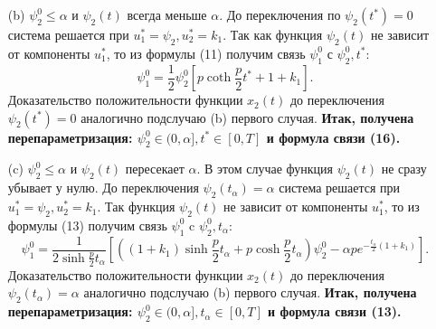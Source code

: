 \documentclass[11pt]{article}
\begin{document}
{\begin{itemize}
{ 		\begin{equation}
 		\psi_2^0 = \alpha e^{-\frac{t_\alpha}{2}(1 + k_1)} \frac{\sinh\frac{p}{2}t^*}{\sinh \frac{p}{2}(t^* - t_\alpha)}.
 		\end{equation}
 		Осталось проверить, что функция $x_2(t)$ положительна при $0 < \psi_2(t) < \alpha.$ Поведение $x_2(t)$ при $t \in [t_\alpha, t^*]$ описывается формулой второй компоненты функции:
 		\[ x(t) = e^{A_x^{k_1}(t - t_\alpha)}x(t_\alpha) + \int_{t\alpha}^{t}\exp\{A_x^{k_1}(t - \tau) \}\begin{pmatrix}
 		0\\
 		\psi_2(\tau)
 		\end{pmatrix}d\tau, \]
 		где $x(t_\alpha)$ определяется формулой (12), а $\psi_2(\tau)$ формулой (9). Из-за громоздкости  выражений не будем приводить доказательство положительности $x_2(t)$. Оно проводится аналогично предыдущему.
 		\newline
 		\textbf{Итак, получена перепараметризация $0 < t_\alpha < t^* \leq T $ и формулы связи (13), (15).}
  	}
 		\item [(b)]{$\psi_2^0 \leq \alpha$ и $\psi_2(t)$ всегда меньше $\alpha.$
 		\newline	
 		До переключения по $\psi_2(t^*) = 0$ система решается при $u_1^* = \psi_2,u_2^* = k_1.$ Так как функция $\psi_2(t)$ не зависит от компоненты $u_1^*$, то из формулы (11) получим связь $\psi_1^0$ с $\psi_2^0,t^*$:
 		\begin{equation}
 		\psi_1^0 = \frac{1}{2}\psi_2^0[p\coth\frac{p}{2}t^* + 1 + k_1].
 		\end{equation}
 		Доказательство положительности функции $x_2(t)$ до переключения $\psi_2(t^*) = 0$ аналогично подслучаю (b) первого случая.
 		\newline
 		\textbf{Итак, получена перепараметризация: $\psi_2^0 \in (0, \alpha], t^* \in [0,T]$ и формула связи (16).}
 	}
 	\item[(c)]{$\psi_2^0 \leq \alpha$ и  $\psi_2(t)$ пересекает $\alpha.$
 	\newline
 	В этом случае функция $\psi_2(t)$ не сразу убывает у нулю. До переключения $\psi_2(t_\alpha) = \alpha$ система решается при $u_1^* = \psi_2, u_2^* = k_1.$ Так функция $\psi_2(t)$ не зависит от компоненты $u_1^*$, то из формулы (13) получим связь $\psi_1^0$ c $\psi_2^0,t_\alpha:$	
 	\[\psi_1^0 = \frac{1}{2\sinh\frac{p}{2}t_{\alpha}}[((1 + k_1)\sinh\frac{p}{2}t_{\alpha} + p\cosh\frac{p}{2}t_{\alpha})\psi_2^0 - \alpha pe^{-\frac{t_{\alpha}}{2}(1 + k_1)}].\]
 	Доказательство положительности функции $x_2(t)$ до переключения $\psi_2(t_\alpha) = \alpha$ аналогично подслучаю (b) первого случая. 
 	\newline 
 	\textbf{Итак, получена перепараметризация: $\psi_2^0 \in (0,\alpha],t_\alpha \in [0, T]$ и формула связи (13).}
 }
 	\end{itemize}
 
}
\end{document}
